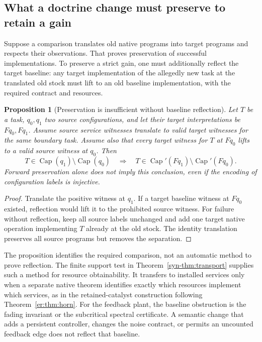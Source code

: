 \documentclass[11pt]{article}
\newtheorem{proposition}[theorem]{Proposition}
\theoremstyle{definition}
\theoremstyle{remark}
\newcommand{\Cap}{\operatorname{Cap}}
\begin{document}
\subsection{What a doctrine change must preserve to retain a gain}
Suppose a comparison translates old native programs into target programs
and respects their observations. That proves preservation of successful
implementations. To preserve a strict gain, one must additionally reflect
the target baseline: any target implementation of the allegedly new task
at the translated old stock must lift to an old baseline implementation,
with the required contract and resources.

\begin{proposition}[Preservation is insufficient without baseline reflection]
\label{prop:service-transport}
Let $T$ be a task, $q_0,q_1$ two source configurations, and let their
target interpretations be $Fq_0,Fq_1$. Assume source service witnesses
translate to valid target witnesses for the same boundary task. Assume
also that every target witness for $T$ at $Fq_0$ lifts to a valid source
witness at $q_0$. Then
\[
 T\in\Cap(q_1)\setminus\Cap(q_0)
 \quad\Longrightarrow\quad
 T\in\Cap'(Fq_1)\setminus\Cap'(Fq_0).
\]
Forward preservation alone does not imply this conclusion, even if the
encoding of configuration labels is injective.
\end{proposition}
\begin{proof}
Translate the positive witness at $q_1$. If a target baseline witness at
$Fq_0$ existed, reflection would lift it to the prohibited source witness.
For failure without reflection, keep all source labels unchanged and add
one target native operation implementing $T$ already at the old stock.
The identity translation preserves all source programs but removes the
separation.
\end{proof}

The proposition identifies the required comparison, not an automatic
method to prove reflection. The finite support test in
Theorem~\ref{syn-thm:transport} supplies such a method for resource
obtainability. It transfers to installed services only when a separate
native theorem identifies exactly which resources implement which
services, as in the retained-catalyst construction following
Theorem~\ref{er:thm:horn}. For the feedback plant, the baseline obstruction
is the fading invariant or the subcritical spectral certificate. A
semantic change that adds a persistent controller, changes the noise
contract, or permits an uncounted feedback edge does not reflect that
baseline.
\end{document}

